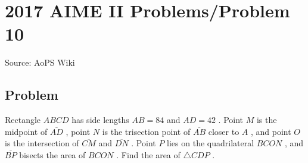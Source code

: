\documentclass[12pt]{article}
\begin{document}
\section*{{2017 AIME II Problems/Problem 10}}
Source: AoPS Wiki

\subsection*{Problem}
Rectangle $ABCD$ has side lengths $AB=84$ and $AD=42$ . Point $M$ is the midpoint of $\overline{AD}$ , point $N$ is the trisection point of $\overline{AB}$ closer to $A$ , and point $O$ is the intersection of $\overline{CM}$ and $\overline{DN}$ . Point $P$ lies on the quadrilateral $BCON$ , and $\overline{BP}$ bisects the area of $BCON$ . Find the area of $\triangle CDP$ .
\end{document}
